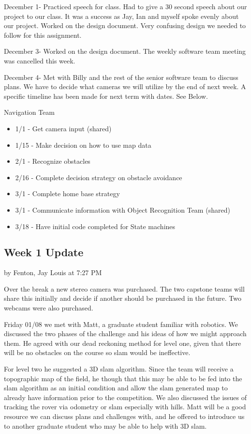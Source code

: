 \documentclass[10pt, oneside,onecolumn]{IEEEtran}
\begin{document}
December 1- Practiced speech for class. Had to give a 30 second speech about our project to our class. It was a success as Jay, Ian and myself spoke evenly about our project. 
Worked on the design document. Very confusing design we needed to follow for this assignment. 

December 3- Worked on the design document. The weekly software team meeting was cancelled this week. 

December 4- Met with Billy and the rest of the senior software team to discuss plans. We have to decide what cameras we will utilize by the end of next week. A specific timeline has been made for next term with dates. See Below.

Navigation Team
\begin{itemize}
\item 1/1 - Get camera input (shared)
\item 1/15 - Make decision on how to use map data
\item 2/1 - Recognize obstacles
\item 2/16 - Complete decision strategy on obstacle avoidance
\item 3/1 - Complete home base strategy
\item 3/1 - Communicate information with Object Recognition Team (shared)
\item 3/18 - Have initial code completed for State machines
\end{itemize}

\subsection{Week 1 Update}
by Fenton, Jay Louis at 7:27 PM

Over the break a new stereo camera was purchased. The two capstone teams will share this initially and decide if another should be purchased in the future. Two webcams were also purchased. 

Friday 01/08 we met with Matt, a graduate student familiar with robotics. We discussed the two phases of the challenge and his ideas of how we might approach them. He agreed with our dead reckoning method for level one, given that there will be no obstacles on the course so slam would be ineffective. 

For level two he suggested a 3D slam algorithm. Since the team will receive a topographic map of the field, he though that this may be able to be fed into the slam algorithm as an initial condition and allow the slam generated map to already have information prior to the competition. We also discussed the issues of tracking the rover via odometry or slam especially with hills. Matt will be a good resource we can discuss plans and challenges with, and he offered to introduce us to another graduate student who may be able to help with 3D slam.
\end{document}
